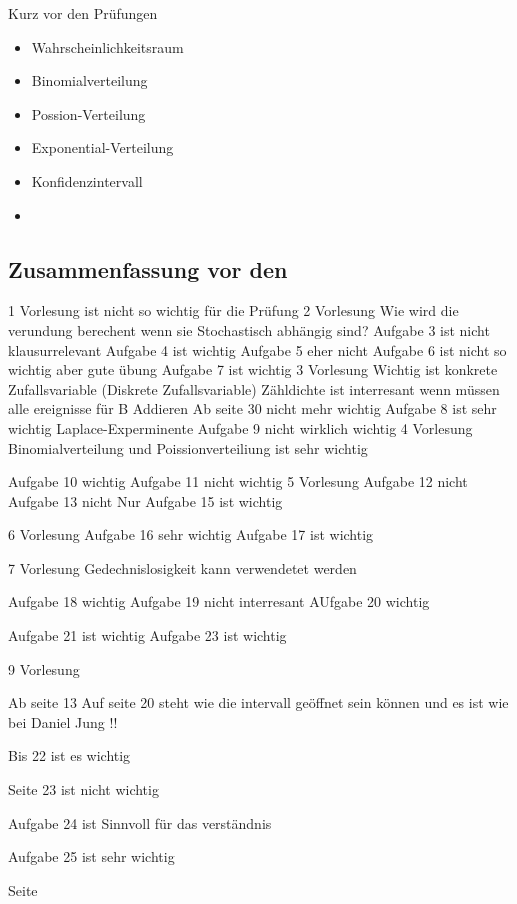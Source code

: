 Kurz vor den Prüfungen
\begin{itemize}
    \item Wahrscheinlichkeitsraum
    \item Binomialverteilung
    \item Possion-Verteilung
    \item Exponential-Verteilung
    \item Konfidenzintervall
    \item 
\end{itemize}
\subsection{Zusammenfassung vor den } 
1 Vorlesung ist nicht so wichtig für die Prüfung
2 Vorlesung Wie wird die verundung berechent wenn sie Stochastisch abhängig sind?
Aufgabe 3 ist nicht klausurrelevant 
Aufgabe 4 ist wichtig 
Aufgabe 5 eher nicht 
Aufgabe 6 ist nicht so wichtig aber gute übung 
Aufgabe 7 ist wichtig 
3 Vorlesung Wichtig ist konkrete Zufallsvariable (Diskrete Zufallsvariable) 
Zähldichte ist interresant wenn müssen alle ereignisse für B Addieren
Ab seite 30 nicht mehr wichtig
Aufgabe 8 ist sehr wichtig Laplace-Experminente
Aufgabe 9 nicht wirklich wichtig
4 Vorlesung Binomialverteilung und Poissionverteiliung ist sehr wichtig

Aufgabe 10 wichtig
Aufgabe 11 nicht wichtig
5 Vorlesung
Aufgabe 12 nicht
Aufgabe 13 nicht
Nur Aufgabe 15 ist wichtig

6 Vorlesung
Aufgabe 16 sehr wichtig
Aufgabe 17 ist wichtig

7 Vorlesung Gedechnislosigkeit kann verwendetet werden 

Aufgabe 18 wichtig
Aufgabe 19 nicht interresant
AUfgabe 20 wichtig

Aufgabe 21 ist wichtig
Aufgabe 23 ist wichtig

9 Vorlesung

Ab seite 13
Auf seite 20 steht wie die intervall geöffnet sein können und es ist wie bei Daniel Jung !!

Bis 22 ist es wichtig

Seite 23 ist nicht wichtig

Aufgabe 24 ist Sinnvoll für das verständnis

Aufgabe 25 ist sehr wichtig



Seite 